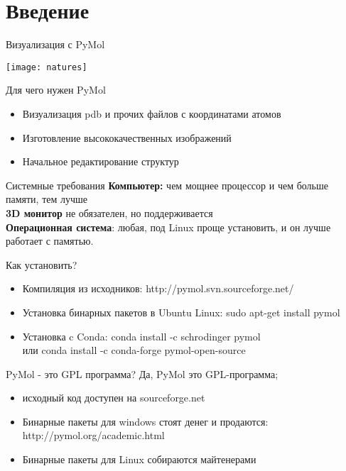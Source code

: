
\section{Введение}

\begin{frame}{Визуализация с PyMol}
	\begin{center}
          \texttt{[image: natures]}
	  \end{center}
  \end{frame}

\begin{frame}{Для чего нужен PyMol}
	\begin{itemize}
	\item Визуализация pdb и прочих файлов с координатами атомов
	\item Изготовление высококачественных изображений
	\item Начальное редактирование структур
	\end{itemize}
\end{frame}

\begin{frame}{Системные требования}
	\textbf{Компьютер:} чем мощнее процессор и чем больше памяти, тем лучше\\
	\textbf{3D монитор} не обязателен, но поддерживается \\
	\textbf{Операционная система}: любая, под Linux проще установить, и он лучше работает с памятью.
\end{frame}

\begin{frame}{Как установить?}
	\begin{itemize}
		\item Компиляция из исходников:   http://pymol.svn.sourceforge.net/
		\item Установка бинарных пакетов в Ubuntu Linux: sudo apt-get install pymol
		\item Установка c Conda: conda install -c schrodinger pymol \\ 
		или  conda install -c conda-forge pymol-open-source
	   \end{itemize}
\end{frame}

\begin{frame}{PyMol - это GPL программа?}
	Да, PyMol это GPL-программа;
	\begin{itemize}
		\item исходный код доступен на sourceforge.net
		\item Бинарные пакеты для windows стоят денег и продаются: http://pymol.org/academic.html
		\item Бинарные пакеты для Linux собираются майтенерами
		\end{itemize}
	\end{frame}


